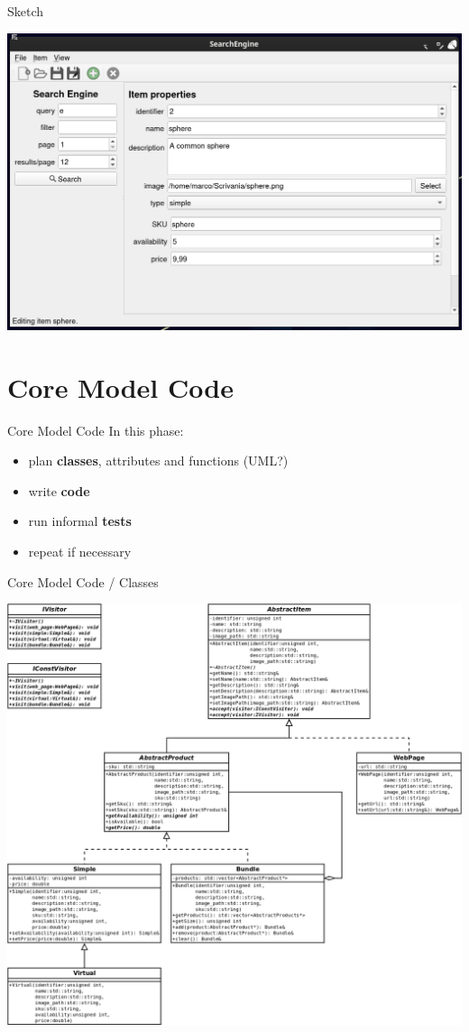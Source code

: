 \documentclass[11pt]{beamer}
\renewcommand{\emph}[1]{\textbf{#1}}
\begin{document}
\begin{frame}{Sketch}
 \begin{center}
  \includegraphics[height=0.55\textwidth]{assets/figure-search-engine-2}
 \end{center}
\end{frame}


\section{Core Model Code}
\begin{frame}{Core Model Code}
 In this phase:
 
 \begin{itemize}
  \item plan \emph{classes}, attributes and functions (UML?)
  \item write \emph{code}
  \item run informal \emph{tests}
  \item repeat if necessary
 \end{itemize}
\end{frame}


\begin{frame}{Core Model Code / Classes}
 \begin{center}
  \includegraphics[height=0.61\textwidth]{assets/diagram-search-engine}
 \end{center}
\end{frame}
\end{document}
